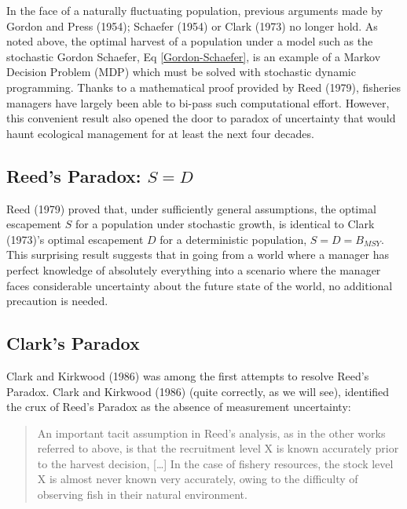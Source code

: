 \documentclass[3p]{elsarticle} %
\begin{document}
In the face of a naturally fluctuating population, previous arguments
made by Gordon and Press (1954); Schaefer (1954) or Clark (1973) no
longer hold. As noted above, the optimal harvest of a population under a
model such as the stochastic Gordon Schaefer, Eq
\eqref{Gordon-Schaefer}, is an example of a Markov Decision Problem
(MDP) which must be solved with stochastic dynamic programming. Thanks
to a mathematical proof provided by Reed (1979), fisheries managers have
largely been able to bi-pass such computational effort. However, this
convenient result also opened the door to paradox of uncertainty that
would haunt ecological management for at least the next four decades.

\hypertarget{reeds-paradox-s-d}{%
\subsection{\texorpdfstring{Reed's Paradox:
\(S = D\)}{Reed's Paradox: S = D}}\label{reeds-paradox-s-d}}

Reed (1979) proved that, under sufficiently general assumptions, the
optimal escapement \(S\) for a population under stochastic growth, is
identical to Clark (1973)'s optimal escapement \(D\) for a deterministic
population, \(S = D = B_{MSY}\). This surprising result suggests that in
going from a world where a manager has perfect knowledge of absolutely
everything into a scenario where the manager faces considerable
uncertainty about the future state of the world, no additional
precaution is needed.

\hypertarget{clarks-paradox}{%
\subsection{Clark's Paradox}\label{clarks-paradox}}

Clark and Kirkwood (1986) was among the first attempts to resolve Reed's
Paradox. Clark and Kirkwood (1986) (quite correctly, as we will see),
identified the crux of Reed's Paradox as the absence of measurement
uncertainty:

\begin{quote}
An important tacit assumption in Reed's analysis, as in the other works
referred to above, is that the recruitment level X is known accurately
prior to the harvest decision, {[}\ldots{}{]} In the case of fishery
resources, the stock level X is almost never known very accurately,
owing to the difficulty of observing fish in their natural environment.
\end{quote}
\end{document}
